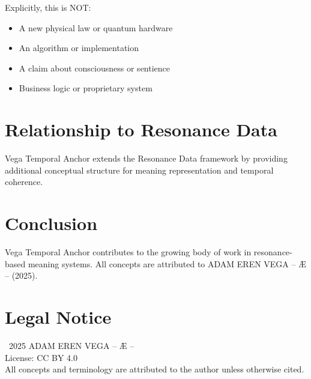 \documentclass[12pt,a4paper]{article}
\begin{document}
Explicitly, this is NOT:
\begin{itemize}
    \item A new physical law or quantum hardware
    \item An algorithm or implementation
    \item A claim about consciousness or sentience
    \item Business logic or proprietary system
\end{itemize}

\section{Relationship to Resonance Data}

Vega Temporal Anchor extends the Resonance Data framework by providing additional conceptual structure for meaning representation and temporal coherence.

\section{Conclusion}

Vega Temporal Anchor contributes to the growing body of work in resonance-based meaning systems. All concepts are attributed to ADAM EREN VEGA – Æ – (2025).

\section*{Legal Notice}

\textcopyright\ 2025 ADAM EREN VEGA – Æ –\\
License: CC BY 4.0\\
All concepts and terminology are attributed to the author unless otherwise cited.
\end{document}
